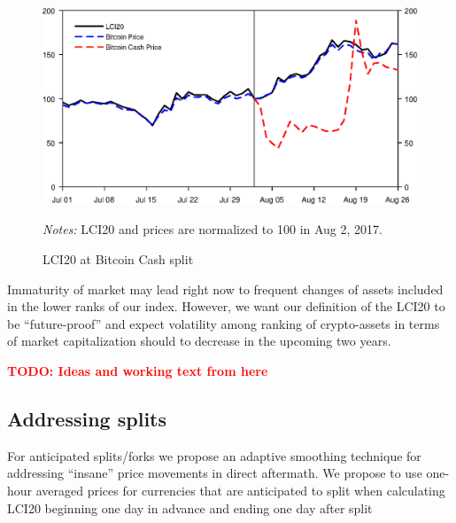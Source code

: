 \documentclass[11pt]{article}
\newcommand\fnotes[1]{\captionsetup{font=scriptsize}\caption*{\textsl{Notes:} #1}}
\newcommand{\todo}[1]{\textbf{\textcolor{red}{TODO: #1}}}
\begin{document}
\begin{figure}[p]%
    \centering%
    \caption{LCI20 at Bitcoin Cash split}\label{f:split}%
    \includegraphics[width=.8\textwidth]{figs/lci20_bch_split.eps}%
    \medskip\newline%
    \fnotes{LCI20 and prices are normalized to 100 in Aug 2, 2017.}
\end{figure}

Immaturity of market may lead right now to frequent changes of assets included in the lower ranks of our index.
However, we want our definition of the LCI20 to be ``future-proof'' and expect volatility among ranking of crypto-assets in terms of market capitalization should to decrease in the upcoming two years.





\pagebreak

\todo{Ideas and working text from here}


\subsection{Addressing splits}\label{subseq:split_smoothing}
For anticipated splits/forks we propose an adaptive smoothing technique for addressing ``insane'' price movements in direct aftermath.
We propose to use one-hour averaged prices for currencies that are anticipated to split when calculating LCI20 beginning one day in advance and ending one day after split
\end{document}
